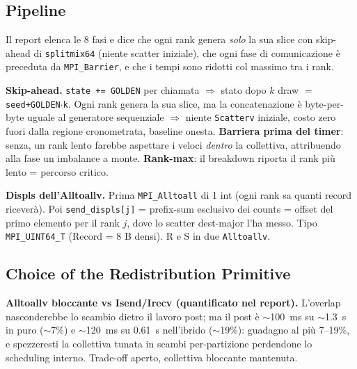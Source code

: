 \documentclass[11pt,a4paper]{article}
\begin{document}
\subsection{Pipeline}

Il report elenca le 8 fasi e dice che ogni rank genera \emph{solo} la sua slice con skip-ahead di \texttt{splitmix64} (niente scatter iniziale), che ogni fase di comunicazione è preceduta da \texttt{MPI\_Barrier}, e che i tempi sono ridotti col massimo tra i rank.

\begin{motiv}
\textbf{Skip-ahead.} \texttt{state += GOLDEN} per chiamata $\Rightarrow$ stato dopo $k$ draw $=$ \texttt{seed+GOLDEN$\cdot$k}. Ogni rank genera la sua slice, ma la concatenazione è byte-per-byte uguale al generatore sequenziale $\Rightarrow$ niente \texttt{Scatterv} iniziale, costo zero fuori dalla regione cronometrata, baseline onesta. \textbf{Barriera prima del timer}: senza, un rank lento farebbe aspettare i veloci \emph{dentro} la collettiva, attribuendo alla fase un imbalance a monte. \textbf{Rank-max}: il breakdown riporta il rank più lento = percorso critico.
\end{motiv}

\begin{deriv}
\textbf{Displs dell'Alltoallv.} Prima \texttt{MPI\_Alltoall} di 1 int (ogni rank sa quanti record riceverà). Poi \texttt{send\_displs[j]} = prefix-sum esclusivo dei counts = offset del primo elemento per il rank $j$, dove lo scatter dest-major l'ha messo. Tipo \texttt{MPI\_UINT64\_T} (Record = 8 B densi). R e S in due \texttt{Alltoallv}.
\end{deriv}

\subsection{Choice of the Redistribution Primitive}

\begin{difesa}
\textbf{Alltoallv bloccante vs Isend/Irecv (quantificato nel report).} L'overlap nasconderebbe lo scambio dietro il lavoro post; ma il post è $\sim$100~ms su $\sim$1.3~s in puro ($\sim$7\%) e $\sim$120~ms su 0.61~s nell'ibrido ($\sim$19\%): guadagno al più 7--19\%, e spezzeresti la collettiva tunata in scambi per-partizione perdendone lo scheduling interno. Trade-off aperto, collettiva bloccante mantenuta.
\end{difesa}

\end{document}
